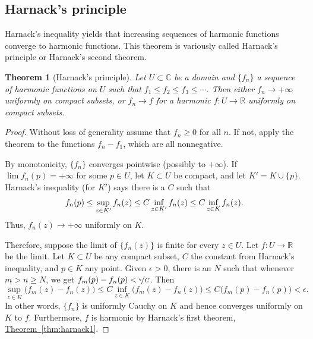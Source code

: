 \documentclass[12pt,openany]{book}
\newcommand{\avoidbreak}{\postdisplaypenalty=100}
\newcommand{\C}{{\mathbb{C}}}
\newcommand{\R}{{\mathbb{R}}}
\theoremstyle{plain}
\newtheorem{thm}{Theorem}[section]
\theoremstyle{remark}
\theoremstyle{definition}
\theoremstyle{exercise}
\theoremstyle{example}
\newcommand{\thmref}[1]{\hyperref[#1]{Theorem~\ref*{#1}}}
\begin{document}
\subsection{Harnack's principle}

Harnack's inequality yields that increasing 
sequences of harmonic functions converge to harmonic functions.
This theorem is variously called
Harnack's principle or Harnack's second theorem.

\begin{thm}[Harnack's principle]
Let $U \subset \C$ be a domain and $\{ f_n \}$ a sequence of
harmonic functions on $U$ such that $f_1 \leq f_2 \leq f_3 \leq \cdots$.
Then either $f_n \to +\infty$ uniformly on compact subsets, or
$f_n \to f$ for a harmonic $f \colon U \to \R$ uniformly on compact subsets.
\end{thm}

\begin{proof}
Without loss of generality assume that $f_n \geq 0$ for all $n$.
If not, apply the theorem to the functions $f_n-f_1$,
which are all nonnegative.

By monotonicity, $\{f_n\}$ converges pointwise (possibly to $+\infty$).
If $\lim f_n(p) = +\infty$ for some $p \in U$, let $K \subset U$
be compact, and let $K' = K \cup \{ p \}$.
Harnack's inequality (for $K'$) says there is a $C$ such that
\begin{equation*}
f_n(p) \leq \sup_{z \in K'} f_n(z) \leq C \inf_{z\in K'} f_n(z) \leq C \inf_{z\in K} f_n(z) .
\avoidbreak
\end{equation*}
Thus, $f_n(z) \to +\infty$ uniformly on $K$.

Therefore, suppose the limit of $\{ f_n(z) \}$ is finite
for every $z \in U$.  Let $f \colon U \to \R$ be the limit.
Let $K \subset U$ be any compact subset,
$C$ the constant from Harnack's inequality, and $p \in K$ any point.
Given $\epsilon > 0$,
there is an $N$
such that whenever $m > n \geq N$, we get
$f_m(p)-f_n(p) < \nicefrac{\epsilon}{C}$.  Then
\begin{equation*}
\sup_{z \in K} \bigl( f_m(z)- f_n(z) \bigr) \leq
C \inf_{z\in K} \bigl( f_m(z)-f_n(z) \bigr)
\leq
C \bigl( f_m(p)-f_n(p) \bigr)
< \epsilon .
\end{equation*}
In other words, $\{ f_n \}$ is uniformly Cauchy on $K$ and hence converges
uniformly on $K$ to $f$.  Furthermore, $f$ is harmonic by
Harnack's first theorem, 
\thmref{thm:harnack1}.
\end{proof}
\end{document}
